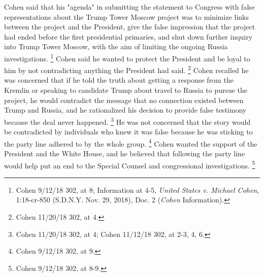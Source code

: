 Cohen said that his "agenda" in submitting the statement to Congress with false representations about the Trump Tower Moscow project was to minimize links between the project and the President, give the false impression that the project had ended before the first presidential primaries, and shut down further inquiry into Trump Tower Moscow, with the aim of limiting the ongoing Russia investigations.%
\footnote{Cohen 9/12/18 302, at 8;
Information at 4-5, \textit{United States v. Michael Cohen}, 1:18-cr-850 (S.D.N.Y. Nov. 29, 2018), Doc. 2 (\textit{Cohen} Information).}
Cohen said he wanted to protect the President and be loyal to him by not contradicting anything the President had said.%
\footnote{Cohen 11/20/18 302, at 4.}
Cohen recalled he was concerned that if he told the truth about getting a response from the Kremlin or speaking to candidate Trump about travel to Russia to pursue the project, he would contradict the message that no connection existed between Trump and Russia, and he rationalized his decision to provide false testimony because the deal never happened.%
\footnote{Cohen 11/20/18 302, at 4;
Cohen 11/12/18 302, at 2-3, 4, 6.}
He was not concerned that the story would be contradicted by individuals who knew it was false because he was sticking to the party line adhered to by the whole group.%
\footnote{Cohen 9/12/18 302, at 9.}
Cohen wanted the support of the President and the White House, and he believed that following the party line would help put an end to the Special Counsel and congressional investigations.%
\footnote{Cohen 9/12/18 302, at 8-9.}

